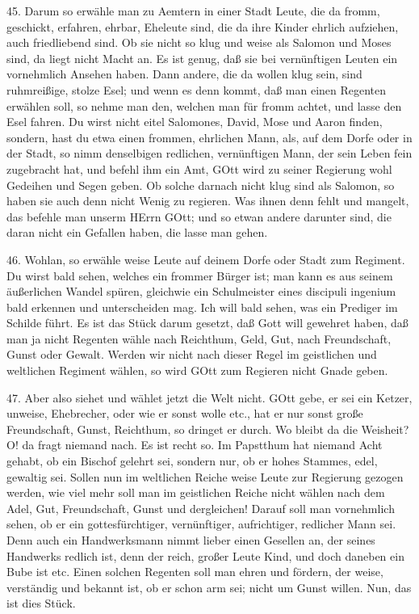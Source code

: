 45. Darum so erwähle man zu Aemtern in einer Stadt Leute, die da fromm, geschickt, erfahren, ehrbar, Eheleute sind, die da ihre Kinder ehrlich aufziehen, auch friedliebend sind. Ob sie nicht so klug und weise als Salomon und Moses sind, da liegt nicht Macht an. Es ist genug, daß sie bei vernünftigen Leuten ein vornehmlich Ansehen haben. Dann andere, die da wollen klug sein, sind ruhmreißige, stolze Esel; und wenn es denn kommt, daß man einen Regenten erwählen soll, so nehme man den, welchen man für fromm achtet, und lasse den Esel fahren. Du wirst nicht eitel Salomones, David, Mose und Aaron finden, sondern, hast du etwa einen frommen, ehrlichen Mann, als, auf dem Dorfe oder in der Stadt, so nimm denselbigen redlichen, vernünftigen Mann, der sein Leben fein zugebracht hat, und befehl ihm ein Amt, GOtt wird zu seiner Regierung wohl Gedeihen und Segen geben. Ob solche darnach nicht klug sind als Salomon, so haben sie auch denn nicht Wenig zu regieren. Was ihnen denn fehlt und mangelt, das befehle man unserm HErrn GOtt; und so etwan andere darunter sind, die daran nicht ein Gefallen haben, die lasse man gehen.

46. Wohlan, so erwähle weise Leute auf deinem Dorfe oder Stadt zum Regiment. Du wirst bald sehen, welches ein frommer Bürger ist; man kann es aus seinem äußerlichen Wandel spüren, gleichwie ein Schulmeister eines discipuli ingenium bald erkennen und unterscheiden mag. Ich will bald sehen, was ein Prediger im Schilde führt. Es ist das Stück darum gesetzt, daß Gott will gewehret haben, daß man ja nicht Regenten wähle nach Reichthum, Geld, Gut, nach Freundschaft, Gunst oder Gewalt. Werden wir nicht nach dieser Regel im geistlichen und weltlichen Regiment wählen, so wird GOtt zum Regieren nicht Gnade geben.

47. Aber also siehet und wählet jetzt die Welt nicht. GOtt gebe, er sei ein Ketzer, unweise, Ehebrecher, oder wie er sonst wolle etc., hat er nur sonst große Freundschaft, Gunst, Reichthum, so dringet er durch. Wo bleibt da die Weisheit? O! da fragt niemand nach. Es ist recht so. Im Papstthum hat niemand Acht gehabt, ob ein Bischof gelehrt sei, sondern nur, ob er hohes
Stammes, edel, gewaltig sei. Sollen nun im weltlichen Reiche weise Leute zur Regierung gezogen werden, wie viel mehr soll man im geistlichen Reiche nicht wählen nach dem Adel, Gut, Freundschaft, Gunst und dergleichen! Darauf soll man vornehmlich sehen, ob er ein gottesfürchtiger, vernünftiger, aufrichtiger, redlicher Mann sei. Denn auch ein Handwerksmann nimmt lieber einen Gesellen an, der seines Handwerks redlich ist, denn der reich, großer Leute Kind, und doch daneben ein Bube ist etc. Einen solchen Regenten soll man ehren und fördern, der weise, verständig und bekannt ist, ob er schon arm sei; nicht um Gunst willen. Nun, das ist dies Stück.

